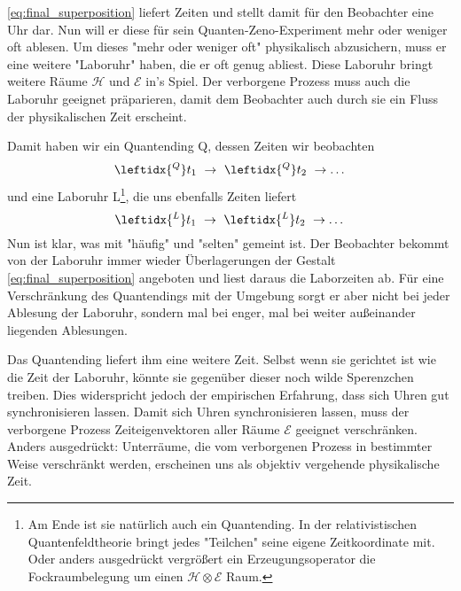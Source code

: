 \documentclass[12pt]{article}
\begin{document}
\eqref{eq:final_superposition} liefert Zeiten und stellt damit für den Beobachter eine Uhr dar. Nun will er diese für sein Quanten-Zeno-Experiment mehr oder weniger oft ablesen. Um dieses "mehr oder weniger oft" physikalisch abzusichern, muss er eine weitere "Laboruhr" haben, die er oft genug abliest. Diese Laboruhr bringt weitere Räume $\mathscr{H}$ und $\mathscr{E}$ in's Spiel. Der verborgene Prozess muss auch die Laboruhr geeignet präparieren, damit dem Beobachter auch durch sie ein Fluss der physikalischen Zeit erscheint.

Damit haben wir ein Quantending Q, dessen Zeiten wir beobachten
\begin{equation*}
\leftidx{^Q}t_1\ \rightarrow\ \leftidx{^Q}t_2\ \rightarrow \dots
\end{equation*}
und eine Laboruhr L\footnote{Am Ende ist sie natürlich auch ein Quantending. In der relativistischen Quantenfeldtheorie bringt jedes "Teilchen" seine eigene Zeitkoordinate mit. Oder anders ausgedrückt vergrößert ein Erzeugungsoperator die Fockraumbelegung um einen $\mathscr{H} \otimes \mathscr{E}$ Raum.}, die uns ebenfalls Zeiten liefert
\begin{equation*}
\leftidx{^L}t_1\ \rightarrow\ \leftidx{^L}t_2 \ \rightarrow \dots
\end{equation*}
Nun ist klar, was mit "häufig" und "selten" gemeint ist. Der Beobachter bekommt von der Laboruhr immer wieder Überlagerungen der Gestalt \eqref{eq:final_superposition} angeboten und liest daraus die Laborzeiten ab. Für eine Verschränkung des Quantendings mit der Umgebung sorgt er aber nicht bei jeder Ablesung der Laboruhr, sondern mal bei enger, mal bei weiter außeinander liegenden Ablesungen. 

Das Quantending liefert ihm eine weitere Zeit. Selbst wenn sie gerichtet ist wie die Zeit der Laboruhr, könnte sie gegenüber dieser noch wilde Sperenzchen treiben. Dies widerspricht jedoch der empirischen Erfahrung, dass sich Uhren gut synchronisieren lassen. Damit sich Uhren synchronisieren lassen, muss der verborgene Prozess Zeiteigenvektoren aller Räume $\mathscr{E}$ geeignet verschränken. Anders ausgedrückt: Unterräume, die vom verborgenen Prozess in bestimmter Weise verschränkt werden, erscheinen uns als objektiv vergehende physikalische Zeit.
\end{document}
